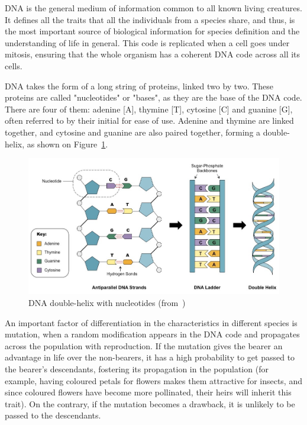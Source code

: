 
DNA is the general medium of information common to all known living creatures. It defines all the traits that all the individuals from a species share, and thus, is the most important source of biological information for species definition and the understanding of life in general. This code is replicated when a cell goes under mitosis, ensuring that the whole organism has a coherent DNA code across all its cells.

DNA takes the form of a long string of proteins, linked two by two. These proteins are called "nucleotides" or "bases", as they are the base of the DNA code. There are four of them: adenine [A], thymine [T], cytosine [C] and guanine [G], often referred to by their initial for ease of use. Adenine and thymine are linked together, and cytosine and guanine are also paired together, forming a double-helix, as shown on Figure~\ref{fig:double-stranded-dnamed}.

\begin{figure}[h]
	\centering
	\includegraphics[width=1\linewidth]{double-stranded-dna_med}
	\caption{DNA double-helix with nucleotides (from~\cite{cornell:dnastructure})}
	\label{fig:double-stranded-dnamed}
\end{figure}


An important factor of differentiation in the characteristics in different species is mutation, when a random modification appears in the DNA code and propagates across the population with reproduction. If the mutation gives the bearer an advantage in life over the non-bearers, it has a high probability to get passed to the bearer's descendants, fostering its propagation in the population (for example, having coloured petals for flowers makes them attractive for insects, and since coloured flowers have become more pollinated, their heirs will inherit this trait). On the contrary, if the mutation becomes a drawback, it is unlikely to be passed to the descendants.

